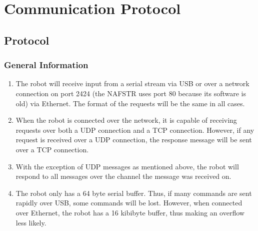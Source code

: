 \documentclass[letterpaper,10pt,english]{sphinxmanual}
\begin{document}
\section{Communication Protocol}
\label{Use:communication-protocol}

\subsection{Protocol}
\label{Use:protocol}

\subsubsection{General Information}
\label{Use:general-information}\begin{enumerate}
\item {} 
The robot will receive input from a serial stream via USB or over a network connection on port 2424 (the NAFSTR uses port 80 because its software is old) via Ethernet. The format of the requests will be the same in all cases.

\item {} 
When the robot is connected over the network, it is capable of receiving requests over both a UDP connection and a TCP connection. However, if any request is received over a UDP connection, the response message will be sent over a TCP connection.

\item {} 
With the exception of UDP messages as mentioned above, the robot will respond to all messages over the channel the message was received on.

\item {} 
The robot only has a 64 byte serial buffer. Thus, if many commands are sent rapidly over USB, some commands will be lost. However, when connected over Ethernet, the robot has a 16 kibibyte buffer, thus making an overflow less likely.

\end{enumerate}
\end{document}
